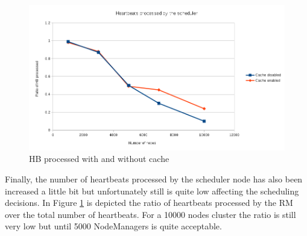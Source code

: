 \begin{figure}
\centering
\includegraphics[scale=0.6]{resources/images/Evaluation/dto_cache_hb_processed.png}
\caption{HB processed with and without cache}
\label{fig:ev_cache_hb_processed}
\end{figure}

Finally, the number of heartbeats processed by the scheduler node has
also been increased a little bit but unfortunately still is quite low
affecting the scheduling decisions. In Figure
\ref{fig:ev_cache_hb_processed} is depicted the ratio of
heartbeats processed by the RM over the total number of
heartbeats. For a 10000 nodes cluster the ratio is still very low but
until 5000 NodeManagers is quite acceptable.